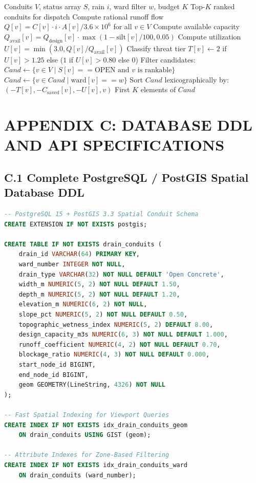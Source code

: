 \documentclass[12pt,a4paper]{report}
\begin{document}
\begin{algorithm}[h!]
\caption{Cascade-Aware Priority Dispatch and Queue Management}
\label{alg:cascade_dispatch}
\begin{algorithmic}[1]
\REQUIRE Conduits $V$, status array $S$, rain $i$, ward filter $w$, budget $K$
\ENSURE Top-$K$ ranked conduits for dispatch
\STATE Compute rational runoff flow $Q[v] = C[v] \cdot i \cdot A[v] / 3.6\times 10^6$ for all $v \in V$
\STATE Compute available capacity $Q_{\text{avail}}[v] = Q_{\text{design}}[v] \cdot \max(1 - \text{silt}[v]/100, 0.05)$
\STATE Compute utilization $U[v] = \min(3.0, Q[v] / Q_{\text{avail}}[v])$
\STATE Classify threat tier $T[v] \leftarrow 2$ if $U[v] > 1.25$ else ($1$ if $U[v] > 0.80$ else $0$)
\STATE Filter candidates: $Cand \leftarrow \{v \in V \mid S[v] == \text{OPEN} \text{ and } v \text{ is rankable}\}$
    \STATE $Cand \leftarrow \{v \in Cand \mid \text{ward}[v] == w\}$
\ENDIF
\STATE Sort $Cand$ lexicographically by: $(-T[v], -C_{\text{saved}}[v], -U[v], v)$
\RETURN First $K$ elements of $Cand$
\end{algorithmic}
\end{algorithm}


\chapter*{APPENDIX C: DATABASE DDL AND API SPECIFICATIONS}

\section*{C.1 Complete PostgreSQL / PostGIS Spatial Database DDL}
\begin{lstlisting}[language=SQL]
-- PostgreSQL 15 + PostGIS 3.3 Spatial Conduit Schema
CREATE EXTENSION IF NOT EXISTS postgis;

CREATE TABLE IF NOT EXISTS drain_conduits (
    drain_id VARCHAR(64) PRIMARY KEY,
    ward_number INTEGER NOT NULL,
    drain_type VARCHAR(32) NOT NULL DEFAULT 'Open Concrete',
    width_m NUMERIC(5, 2) NOT NULL DEFAULT 1.50,
    depth_m NUMERIC(5, 2) NOT NULL DEFAULT 1.20,
    elevation_m NUMERIC(6, 2) NOT NULL,
    slope_pct NUMERIC(5, 2) NOT NULL DEFAULT 0.50,
    topographic_wetness_index NUMERIC(5, 2) DEFAULT 8.00,
    design_capacity_m3s NUMERIC(6, 3) NOT NULL DEFAULT 1.000,
    runoff_coefficient NUMERIC(4, 2) NOT NULL DEFAULT 0.70,
    blockage_ratio NUMERIC(4, 3) NOT NULL DEFAULT 0.000,
    start_node_id BIGINT,
    end_node_id BIGINT,
    geom GEOMETRY(LineString, 4326) NOT NULL
);

-- Fast Spatial Indexing for Viewport Queries
CREATE INDEX IF NOT EXISTS idx_drain_conduits_geom 
    ON drain_conduits USING GIST (geom);

-- Attribute Indexes for Zone-Based Filtering
CREATE INDEX IF NOT EXISTS idx_drain_conduits_ward 
    ON drain_conduits (ward_number);
\end{lstlisting}
\end{document}
